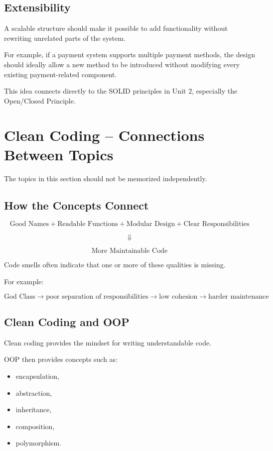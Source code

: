 \documentclass[11pt,a4paper]{article}
\begin{document}
\subsection{Extensibility}

A scalable structure should make it possible to add functionality without
rewriting unrelated parts of the system.

For example, if a payment system supports multiple payment methods, the design
should ideally allow a new method to be introduced without modifying every
existing payment-related component.

This idea connects directly to the SOLID principles in Unit 2, especially
the Open/Closed Principle.

\section{Clean Coding -- Connections Between Topics}

The topics in this section should not be memorized independently.

\subsection{How the Concepts Connect}

\[
\boxed{
\text{Good Names}
+
\text{Readable Functions}
+
\text{Modular Design}
+
\text{Clear Responsibilities}
}
\]

\[
\Downarrow
\]

\[
\boxed{\text{More Maintainable Code}}
\]

Code smells often indicate that one or more of these qualities is missing.

For example:

\[
\text{God Class}
\rightarrow
\text{poor separation of responsibilities}
\rightarrow
\text{low cohesion}
\rightarrow
\text{harder maintenance}
\]

\subsection{Clean Coding and OOP}

Clean coding provides the mindset for writing understandable code.

OOP then provides concepts such as:

\begin{itemize}
    \item encapsulation,
    \item abstraction,
    \item inheritance,
    \item composition,
    \item polymorphism.
\end{itemize}
\end{document}
